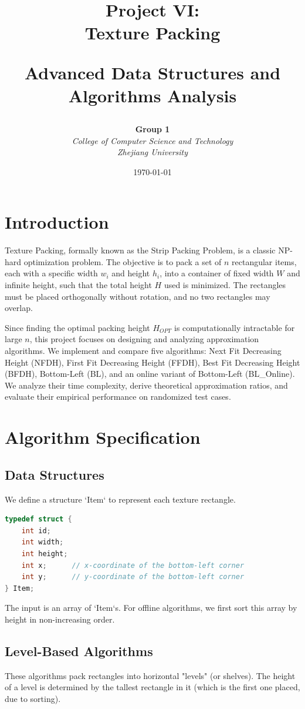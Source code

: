 \documentclass[a4paper,12pt]{article}
\title{
    \centering
    \vspace{1cm}
    \vspace{2cm}
    {\Huge\bfseries Project VI:\\[0.5em]Texture Packing\par}
    \vspace{0.5cm}
    {Advanced Data Structures and Algorithms Analysis}\par
    \vspace{1cm}
}
\author{
    \textbf{Group 1} \\[0.5cm]
    \textit{College of Computer Science and Technology} \\
    \textit{Zhejiang University}
}
\date{\today}
\begin{document}
\maketitle
\thispagestyle{empty}
\newpage

\tableofcontents
\newpage

\section{Introduction}
Texture Packing, formally known as the Strip Packing Problem, is a classic NP-hard optimization problem. The objective is to pack a set of $n$ rectangular items, each with a specific width $w_i$ and height $h_i$, into a container of fixed width $W$ and infinite height, such that the total height $H$ used is minimized. The rectangles must be placed orthogonally without rotation, and no two rectangles may overlap.

Since finding the optimal packing height $H_{OPT}$ is computationally intractable for large $n$, this project focuses on designing and analyzing approximation algorithms. We implement and compare five algorithms: Next Fit Decreasing Height (NFDH), First Fit Decreasing Height (FFDH), Best Fit Decreasing Height (BFDH), Bottom-Left (BL), and an online variant of Bottom-Left (BL\_Online). We analyze their time complexity, derive theoretical approximation ratios, and evaluate their empirical performance on randomized test cases.

\section{Algorithm Specification}

\subsection{Data Structures}
We define a structure `Item` to represent each texture rectangle.
\begin{lstlisting}[language=C]
typedef struct {
    int id;
    int width;
    int height;
    int x;      // x-coordinate of the bottom-left corner
    int y;      // y-coordinate of the bottom-left corner
} Item;
\end{lstlisting}
The input is an array of `Item`s. For offline algorithms, we first sort this array by height in non-increasing order.

\subsection{Level-Based Algorithms}
These algorithms pack rectangles into horizontal "levels" (or shelves). The height of a level is determined by the tallest rectangle in it (which is the first one placed, due to sorting).
\end{document}
